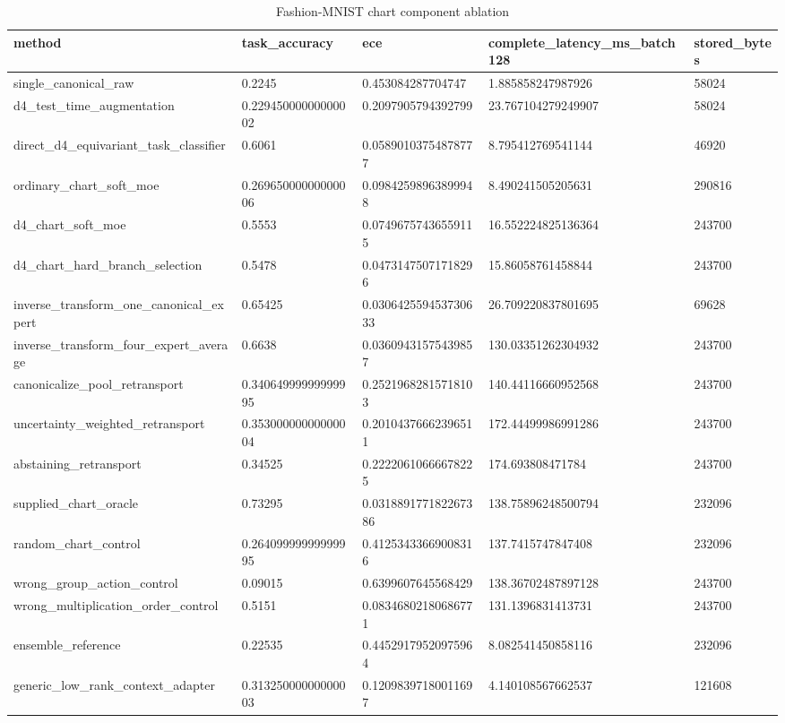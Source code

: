 \begin{table}[t]
\centering
\caption{Fashion-MNIST chart component ablation}
\begin{tabular}{lllll}
\toprule
method & task\_accuracy & ece & complete\_latency\_ms\_batch128 & stored\_bytes \\
\midrule
single\_canonical\_raw & 0.2245 & 0.453084287704747 & 1.885858247987926 & 58024 \\
d4\_test\_time\_augmentation & 0.22945000000000002 & 0.2097905794392799 & 23.767104279249907 & 58024 \\
direct\_d4\_equivariant\_task\_classifier & 0.6061 & 0.05890103754878777 & 8.795412769541144 & 46920 \\
ordinary\_chart\_soft\_moe & 0.26965000000000006 & 0.09842598963899948 & 8.490241505205631 & 290816 \\
d4\_chart\_soft\_moe & 0.5553 & 0.07496757436559115 & 16.552224825136364 & 243700 \\
d4\_chart\_hard\_branch\_selection & 0.5478 & 0.04731475071718296 & 15.86058761458844 & 243700 \\
inverse\_transform\_one\_canonical\_expert & 0.65425 & 0.030642559453730633 & 26.709220837801695 & 69628 \\
inverse\_transform\_four\_expert\_average & 0.6638 & 0.03609431575439857 & 130.03351262304932 & 243700 \\
canonicalize\_pool\_retransport & 0.34064999999999995 & 0.25219682815718103 & 140.44116660952568 & 243700 \\
uncertainty\_weighted\_retransport & 0.35300000000000004 & 0.20104376662396511 & 172.44499986991286 & 243700 \\
abstaining\_retransport & 0.34525 & 0.22220610666678225 & 174.693808471784 & 243700 \\
supplied\_chart\_oracle & 0.73295 & 0.031889177182267386 & 138.75896248500794 & 232096 \\
random\_chart\_control & 0.26409999999999995 & 0.41253433669008316 & 137.7415747847408 & 232096 \\
wrong\_group\_action\_control & 0.09015 & 0.6399607645568429 & 138.36702487897128 & 243700 \\
wrong\_multiplication\_order\_control & 0.5151 & 0.08346802180686771 & 131.1396831413731 & 243700 \\
ensemble\_reference & 0.22535 & 0.44529179520975964 & 8.082541450858116 & 232096 \\
generic\_low\_rank\_context\_adapter & 0.31325000000000003 & 0.12098397180011697 & 4.140108567662537 & 121608 \\
\bottomrule
\end{tabular}
\end{table}
